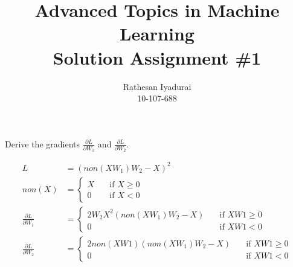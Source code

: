 \documentclass[11pt]{article}
\title{Advanced Topics in Machine Learning \\ Solution Assignment \#1}
\author{Rathesan Iyadurai \\ 10-107-688}
\begin{document}
\maketitle

Derive the gradients $\frac{\partial L}{\partial W_1}$ and $\frac{\partial L}{\partial W_2}$.

\begin{equation*}
\begin{split}
L &= (non(XW_1)W_2 - X)^2\\
non(X) &= 
\begin{cases}
	X & \quad \text{if } X \geq 0 \\
	0 & \quad \text{if } X < 0
\end{cases} \\
\frac{\partial L}{\partial W_1} &= 
\begin{cases}
	2W_2X^2(non(XW_1)W_2 - X) & \quad \text{if } XW1 \geq 0 \\
	0                      & \quad \text{if } XW1 < 0
\end{cases}\\
\frac{\partial L}{\partial W_2} &=
\begin{cases}
	2non(XW1)(non(XW_1)W_2 - X) & \quad \text{if } XW1 \geq 0 \\
	0                      & \quad \text{if } XW1 < 0
\end{cases}\\
\end{split}
\end{equation*}
\end{document}

